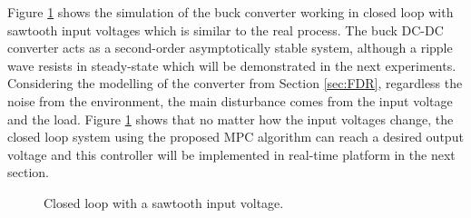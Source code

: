 \documentclass[journal]{IEEEtran}
\begin{document}
Figure \ref{fig:plecsclose} shows the simulation of the buck converter working in closed loop with sawtooth input voltages which is similar to the real process. The buck DC-DC converter acts as a second-order asymptotically stable system, although a ripple wave resists in steady-state which will be demonstrated in the next experiments. Considering the modelling of the converter from Section \ref{sec:FDR}, regardless the noise from the environment, the main disturbance comes from the input voltage and the load. Figure \ref{fig:plecsclose} shows that no matter how the input voltages change, the closed loop system using the proposed MPC algorithm can reach a desired output voltage and this controller will be implemented in real-time platform in the next section.
\begin{figure}\centering
	\hspace{0.5in}
	\caption{Closed loop with a sawtooth input voltage. }
	\label{fig:plecsclose}
\end{figure}
\end{document}
